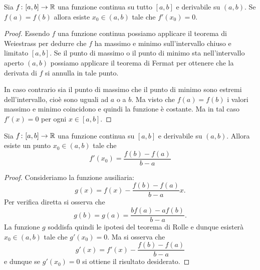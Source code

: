 \begin{theorem}[Rolle]
\mymark{***}
Sia $f\colon [a,b]\to \mathbb R$ una funzione continua su tutto $[a,b]$ e derivabile su $(a,b)$. Se $f(a) = f(b)$ allora esiste $x_0 \in (a,b)$ tale che $f'(x_0)=0$.
\end{theorem}
%
\begin{proof}
\mymark{***}
Essendo $f$ una funzione continua
possiamo applicare il teorema di Weiestrass per dedurre che $f$ ha massimo e minimo sull'intervallo chiuso e limitato $[a,b]$. Se il punto di massimo o il punto di minimo sta nell'intervallo aperto $(a,b)$ possiamo applicare il teorema di Fermat per ottenere che la derivata di $f$ si annulla in tale punto.

In caso contrario sia il punto di massimo che il punto di minimo sono estremi dell'intervallo, cioè sono uguali ad $a$ o a $b$. Ma visto che $f(a)=f(b)$ i valori massimo e minimo coincidono e quindi la funzione è costante. Ma in tal caso $f'(x)=0$ per ogni $x\in [a,b]$.
\end{proof}

\begin{theorem}[Lagrange]\label{th:lagrange}%
\mymark{***}%
%
%
Sia $f\colon [a,b]\to \mathbb R$ una funzione continua su $[a,b]$ e derivabile su $(a,b)$. Allora esiste un punto $x_0\in (a,b)$ tale che
\[
  f'(x_0) = \frac{f(b) - f(a)}{b-a}
\]
\end{theorem}
%
\begin{proof}
\mymark{***}
Consideriamo la funzione ausiliaria:
\[
  g(x) = f(x) - \frac{f(b)-f(a)}{b-a} x.
\]
Per verifica diretta si osserva che
\[
  g(b) = g(a) = \frac{b f(a) - a f(b)}{b-a}.
\]
La funzione $g$ soddisfa quindi le ipotesi del teorema di Rolle e dunque esisterà $x_0\in (a,b)$ tale che $g'(x_0)=0$.
Ma si osserva che
\[
  g'(x) = f'(x) - \frac{f(b)-f(a)}{b-a}
\]
e dunque se $g'(x_0)=0$ si ottiene il risultato desiderato.
\end{proof}

